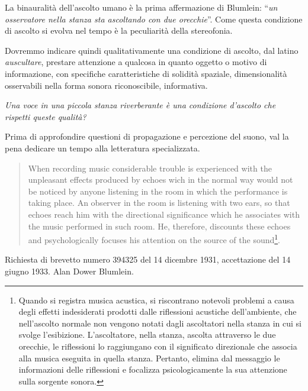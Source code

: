 La binauralità dell'ascolto umano è la prima affermazione di Blumlein:
“\emph{un osservatore nella stanza sta ascoltando con due orecchie}”. Come
questa condizione di ascolto si evolva nel tempo è la peculiarità della
stereofonia.


Dovremmo indicare quindi qualitativamente una condizione di ascolto, dal latino
\emph{auscultare}, prestare attenzione a qualcosa in quanto oggetto o motivo di informazione, con specifiche caratteristiche di solidità spaziale, dimensionalità osservabili nella forma sonora riconoscibile, informativa.

\emph{Una voce in una piccola stanza riverberante è una condizione d'ascolto che
rispetti queste qualità?}

Prima di approfondire questioni di propagazione e percezione del suono, val la pena
dedicare un tempo alla letteratura specializzata.

\begin{quote}
When recording music considerable trouble is experienced with the unpleasant
effects produced by echoes wich in the normal way would not be noticed by anyone
listening in the room in which the performance is taking place. An observer in
the room is listening with two ears, so that echoes reach him with the directional
significance which he associates with the music performed in such room. He,
therefore, discounts these echoes and psychologically focuses his attention on
the source of the sound\footnote{Quando si registra musica acustica, si riscontrano
notevoli problemi a causa degli effetti indesiderati prodotti dalle riflessioni
acustiche dell'ambiente, che nell'ascolto normale non vengono notati dagli
ascoltatori nella stanza in cui si svolge l'esibizione. L'ascoltatore, nella stanza,
ascolta attraverso le due orecchie, le riflessioni lo raggiungano con il significato direzionale che associa alla musica eseguita in quella stanza.
Pertanto, elimina dal messaggio le informazioni delle riflessioni e focalizza
psicologicamente la sua attenzione sulla sorgente sonora.}.
\end{quote}

Richiesta di brevetto numero 394325 del 14 dicembre 1931, accettazione del 14
giugno 1933. Alan Dower Blumlein.

